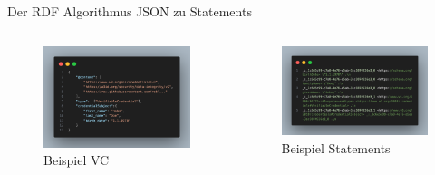 \documentclass[
	german,%
	authorontitle=true,
	]{bfhbeamer}
\begin{document}
\begin{frame}{Der RDF Algorithmus}
    \centering
    JSON zu Statements
    \begin{columns}[onlytextwidth,T]
        \column{70mm}  
        \begin{figure}
            \centering
            \includegraphics[width=70mm]{../img/VCexp.png}
            \caption{Beispiel VC}
        \end{figure}

        \column{70mm}  
        \begin{figure}
            \centering
            \includegraphics[width=70mm]{../img/Statements.png}
            \caption{Beispiel Statements}
        \end{figure}
    \end{columns}
\end{frame}
\end{document}
